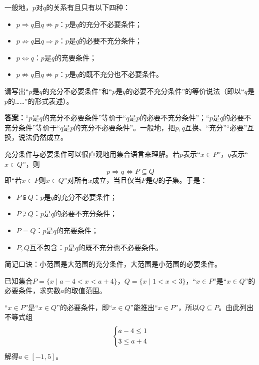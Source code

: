 一般地，$p$对$q$的关系有且只有以下四种：
\begin{itemize}
    \item $p\Rightarrow q$且$q\not\Rightarrow p$：$p$是$q$的充分不必要条件；
    \item $p\not\Rightarrow q$且$q\Rightarrow p$：$p$是$q$的必要不充分条件；
    \item $p\Leftrightarrow q$：$p$是$q$的充要条件；
    \item $p\not\Rightarrow q$且$q\not\Rightarrow p$：$p$是$q$的既不充分也不必要条件。
\end{itemize}

\begin{exercise}
请写出“$p$是$q$的充分不必要条件”和“$p$是$q$的必要不充分条件”的等价说法（即以“$q$是$p$的……”的形式表述）。
\end{exercise}
\textbf{答案：}“$p$是$q$的充分不必要条件”等价于“$q$是$p$的必要不充分条件”；“$p$是$q$的必要不充分条件”等价于“$q$是$p$的充分不必要条件”。一般地，把$p,q$互换、“充分”“必要”互换，说法仍然成立。

充分条件与必要条件可以很直观地用集合语言来理解。若$p$表示“$x\in P$”，$q$表示“$x\in Q$”，则
\[p\Rightarrow q \iff P\subseteq Q\]
即“若$x\in P$则$x\in Q$”对所有$x$成立，当且仅当$P$是$Q$的子集。于是：
\begin{itemize}
    \item $P\subsetneqq Q$：$p$是$q$的充分不必要条件；
    \item $P\supsetneqq Q$：$p$是$q$的必要不充分条件；
    \item $P=Q$：$p$是$q$的充要条件；
    \item $P,Q$互不包含：$p$是$q$的既不充分也不必要条件。
\end{itemize}
简记口诀：小范围是大范围的充分条件，大范围是小范围的必要条件。

\begin{example}
已知集合$P=\{x\mid a-4<x<a+4\}$，$Q=\{x\mid 1<x<3\}$，“$x\in P$”是“$x\in Q$”的必要条件，求实数$a$的取值范围。
\end{example}
\begin{jie}
“$x\in P$”是“$x\in Q$”的必要条件，即“$x\in Q$”能推出“$x\in P$”，所以$Q\subseteq P$。由此列出不等式组
\[
\left\{\begin{lgathered}
a-4\leq 1\\
3\leq a+4
\end{lgathered}\right.
\]
解得$a\in[-1,5]$。
\end{jie}

